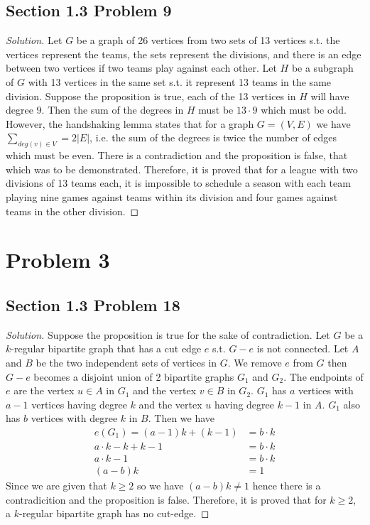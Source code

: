 \documentclass[12pt]{article}
\newenvironment*{solution}{\begin{proof}[Solution]}{\end{proof}}
\begin{document}
\subsection*{Section 1.3 Problem 9}
\begin{solution}
    Let \(G\) be a graph of 26 vertices from two sets of 13 vertices s.t. the
    vertices represent the teams, the sets represent the divisions, and there
    is an edge between two vertices if two teams play against each other. Let
    \(H\) be a subgraph of \(G\) with 13 vertices in the same set s.t. it
    represent 13 teams in the same division. Suppose the proposition is true,
    each of the 13 vertices in \(H\) will have degree \(9\). Then the sum of
    the degrees in \(H\) must be \(13\cdot9\) which must be odd. However, the
    handshaking lemma states that for a graph \(G=(V,E)\) we have \(\sum_{deg
    (v)\in V}=2|E|\), i.e. the sum of the degrees is twice the number of edges
    which must be even. There is a contradiction and the proposition is false,
    that which was to be demonstrated. Therefore, it is proved that for a
    league with two divisions of 13 teams each, it is impossible to schedule a
    season with each team playing nine games against teams within its division
    and four games against teams in the other division.
\end{solution}
\section*{Problem 3}
\subsection*{Section 1.3 Problem 18}
\begin{solution}
    Suppose the proposition is true for the sake of contradiction. Let \(G\)
    be a \(k\)-regular bipartite graph that has a cut edge \(e\) s.t. \(G-e\)
    is not connected. Let \(A\) and \(B\) be the two independent sets of
    vertices in \(G\). We remove \(e\) from \(G\) then \(G-e\) becomes a
    disjoint union of 2 bipartite graphs \(G_1\) and \(G_2\). The endpoints of
    \(e\) are the vertex \(u\in A\) in \(G_1\) and the vertex \(v\in B\) in
    \(G_2\). \(G_1\) has \(a\) vertices with \(a-1\) vertices having degree
    \(k\) and the vertex \(u\) having degree \(k-1\) in \(A\). \(G_1\) also
    has \(b\) vertices with degree \(k\) in \(B\). Then we have
    \begin{align*}
        e(G_1)=(a-1)k+(k-1) &= b\cdot k \\ a\cdot k-k+k-1 &= b\cdot k \\ a
        \cdot k-1 &= b\cdot k \\ (a-b)k &= 1
    \end{align*}
    Since we are given that \(k\geq2\) so we have \((a-b)k\neq1\) hence there
    is a contradicition and the proposition is false. Therefore, it is proved
    that for \(k\geq2\), a \(k\)-regular bipartite graph has no cut-edge.
\end{solution}
\end{document}
